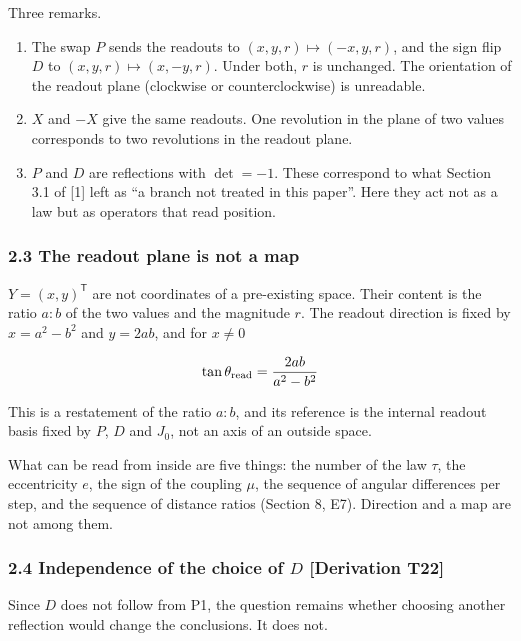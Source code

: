 \documentclass[
  a4paper,
]{article}
\begin{document}
Three remarks.

\begin{enumerate}
\def\labelenumi{(\roman{enumi})}
\item
  The swap \(P\) sends the readouts to \((x,y,r)\mapsto(-x,y,r)\), and
  the sign flip \(D\) to \((x,y,r)\mapsto(x,-y,r)\). Under both, \(r\)
  is unchanged. The orientation of the readout plane (clockwise or
  counterclockwise) is unreadable.
\item
  \(X\) and \(-X\) give the same readouts. One revolution in the plane
  of two values corresponds to two revolutions in the readout plane.
\item
  \(P\) and \(D\) are reflections with \(\det=-1\). These correspond to
  what Section 3.1 of {[}1{]} left as ``a branch not treated in this
  paper''. Here they act not as a law but as operators that read
  position.
\end{enumerate}

\subsubsection{2.3 The readout plane is not a
map}\label{the-readout-plane-is-not-a-map}

\(Y=(x,y)^{\mathsf T}\) are not coordinates of a pre-existing space.
Their content is the ratio \(a:b\) of the two values and the magnitude
\(r\). The readout direction is fixed by \(x=a^2-b^2\) and \(y=2ab\),
and for \(x\neq0\)

\[
\tan\theta_{\rm read}=\frac{2ab}{a^2-b^2}
\]

This is a restatement of the ratio \(a:b\), and its reference is the
internal readout basis fixed by \(P\), \(D\) and \(J_0\), not an axis of
an outside space.

What can be read from inside are five things: the number of the law
\(\tau\), the eccentricity \(e\), the sign of the coupling \(\mu\), the
sequence of angular differences per step, and the sequence of distance
ratios (Section 8, E7). Direction and a map are not among them.

\subsubsection{\texorpdfstring{2.4 Independence of the choice of \(D\)
{[}Derivation
T22{]}}{2.4 Independence of the choice of D {[}Derivation T22{]}}}\label{independence-of-the-choice-of-d-derivation-t22}

Since \(D\) does not follow from P1, the question remains whether
choosing another reflection would change the conclusions. It does not.
\end{document}
